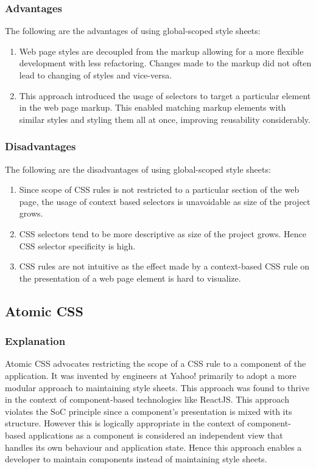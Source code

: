 \documentclass[12pt]{article}
\begin{document}

\subsubsection{Advantages}
The following are the advantages of using global-scoped style sheets:
\begin{enumerate}
	\item Web page styles are decoupled from the markup allowing for a more flexible development with less refactoring. Changes made to the markup did not often lead to changing of styles and vice-versa.

	\item This approach introduced the usage of selectors to target a particular element in the web page markup. This enabled matching markup elements with similar styles and styling them all at once, improving reusability considerably.
\end{enumerate} 

\subsubsection{Disadvantages}
The following are the disadvantages of using global-scoped style sheets:
\begin{enumerate}
	\item Since scope of CSS rules is not restricted to a particular section of the web page, the usage of context based selectors is unavoidable as size of the project grows.

	\item CSS selectors tend to be more descriptive as size of the project grows. Hence CSS selector specificity is high.

	\item CSS rules are not intuitive as the effect made by a context-based CSS rule on the presentation of a web page element is hard to visualize.
\end{enumerate}

\subsection{Atomic CSS}
\subsubsection{Explanation}
Atomic CSS advocates restricting the scope of a CSS rule to a component of the application. It was invented by engineers at Yahoo! primarily to adopt a more modular approach to maintaining style sheets. This approach was found to thrive in the context of component-based technologies like ReactJS. This approach violates the SoC principle since a component's presentation is mixed with its structure. However this is logically appropriate in the context of component-based applications as a component is considered an independent view that handles its own behaviour and application state. Hence this approach enables a developer to maintain components instead of maintaining style sheets.
\end{document}
